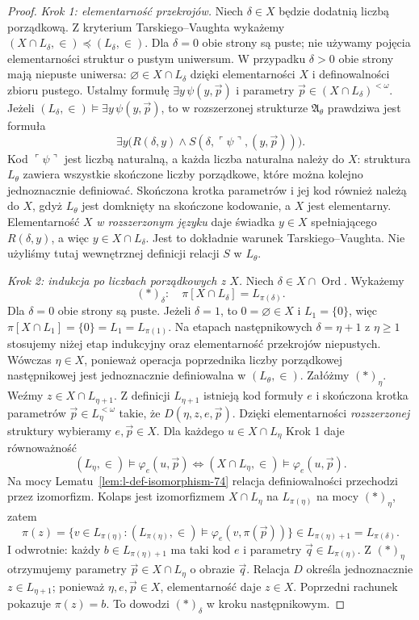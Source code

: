 \begin{proof}
\emph{Krok 1: elementarność przekrojów.}
Niech $\delta\in X$ będzie dodatnią liczbą porządkową.
Z kryterium Tarskiego--Vaughta wykażemy
$(X\cap L_\delta,\in)\preccurlyeq(L_\delta,\in)$.
Dla $\delta=0$ obie strony są puste; nie używamy
pojęcia elementarności struktur o pustym uniwersum.
W przypadku $\delta>0$ obie strony mają niepuste
uniwersa: $\varnothing\in X\cap L_\delta$ dzięki
elementarności $X$ i definowalności zbioru pustego.
Ustalmy formułę $\exists y\,\psi(y,\vec p)$
i parametry $\vec p\in(X\cap L_\delta)^{<\omega}$.
Jeżeli $(L_\delta,\in)\models\exists y\,\psi(y,\vec p)$,
to w rozszerzonej strukturze $\mathfrak A_\theta$
prawdziwa jest formuła
\[
\exists y\bigl(R(\delta,y)\land
 S(\delta,\ulcorner\psi\urcorner,(y,\vec p))\bigr).
\]
Kod $\ulcorner\psi\urcorner$ jest liczbą naturalną,
a każda liczba naturalna należy do $X$:
struktura $L_\theta$ zawiera wszystkie skończone
liczby porządkowe, które można kolejno jednoznacznie
definiować. Skończona krotka parametrów i jej kod
również należą do $X$, gdyż $L_\theta$ jest domknięty
na skończone kodowanie, a $X$ jest elementarny.
Elementarność $X$ \emph{w rozszerzonym języku}
daje świadka $y\in X$ spełniającego $R(\delta,y)$,
a więc $y\in X\cap L_\delta$. Jest to dokładnie
warunek Tarskiego--Vaughta. Nie użyliśmy tutaj
wewnętrznej definicji relacji $S$ w $L_\theta$.

\emph{Krok 2: indukcja po liczbach porządkowych z $X$.}
Niech $\delta\in X\cap\operatorname{Ord}$. Wykażemy
\[
(\ast)_\delta:\quad
\pi[X\cap L_\delta]=L_{\pi(\delta)}.
\]
Dla $\delta=0$ obie strony są puste.
Jeżeli $\delta=1$, to $0=\varnothing\in X$
i $L_1=\{0\}$, więc
$\pi[X\cap L_1]=\{0\}=L_1=L_{\pi(1)}$.
Na etapach następnikowych $\delta=\eta+1$ z
$\eta\geq1$ stosujemy niżej etap indukcyjny
oraz elementarność przekrojów niepustych.
Wówczas $\eta\in X$, ponieważ operacja
poprzednika liczby porządkowej następnikowej jest
jednoznacznie definiowalna w $(L_\theta,\in)$.
Załóżmy $(\ast)_\eta$. Weźmy $z\in X\cap L_{\eta+1}$.
Z definicji $L_{\eta+1}$ istnieją kod formuły $e$
i skończona krotka parametrów $\vec p\in L_\eta^{<\omega}$
takie, że $D(\eta,z,e,\vec p)$. Dzięki elementarności
\emph{rozszerzonej} struktury wybieramy
$e,\vec p\in X$. Dla każdego $u\in X\cap L_\eta$
Krok 1 daje równoważność
\[
(L_\eta,\in)\models\varphi_e(u,\vec p)
\iff
(X\cap L_\eta,\in)\models\varphi_e(u,\vec p).
\]
Na mocy Lematu~\ref{lem:l-def-isomorphism-74}
relacja definiowalności przechodzi przez izomorfizm.
Kolaps jest izomorfizmem $X\cap L_\eta$ na
$L_{\pi(\eta)}$ na mocy $(\ast)_\eta$, zatem
\[
\pi(z)=\{v\in L_{\pi(\eta)}:
(L_{\pi(\eta)},\in)\models
\varphi_e(v,\pi(\vec p))\}\in
L_{\pi(\eta)+1}=L_{\pi(\delta)}.
\]
I odwrotnie: każdy $b\in L_{\pi(\eta)+1}$ ma taki
kod $e$ i parametry $\vec q\in L_{\pi(\eta)}$.
Z $(\ast)_\eta$ otrzymujemy parametry
$\vec p\in X\cap L_\eta$ o obrazie $\vec q$.
Relacja $D$ określa jednoznacznie $z\in L_{\eta+1}$;
ponieważ $\eta,e,\vec p\in X$, elementarność daje
$z\in X$. Poprzedni rachunek pokazuje $\pi(z)=b$.
To dowodzi $(\ast)_\delta$ w kroku następnikowym.


\end{proof}
